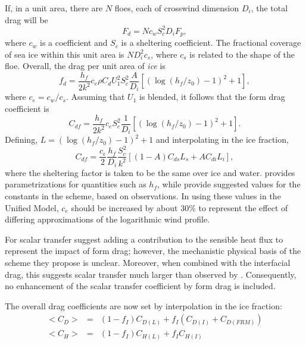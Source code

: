\documentclass{UMDP_article}
\begin{document}
\begin{enumerate}
If, in a unit area, there are $N$ floes, each of crosswind dimension $D_i$,
the total drag will be
\begin{equation}
F_d = N c_w S_c^2 D_i F_p,
\label{eq:fd_fp}
\end{equation}
where $c_w$ is a coefficient and $S_c$ is a sheltering coefficient. The
fractional coverage of sea ice within this unit area is $ND_i^2 c_s$, 
where $c_s$ is related to the shape of the floe. Overall, the drag per 
unit area of {\em ice} is
\begin{equation}
f_d = \frac{h_f}{2k^2} c_e \rho C_d U_1^2 S_c^2 \frac{A}{D_i}
\left [(\log(h_f/z_0) -1)^2 +1 \right ],
\end{equation}
where $c_e=c_w/c_s$. Assuming that $U_1$ is blended, it follows that the
form drag coefficient is
\begin{equation}
C_{df} = \frac{h_f}{2k^2} c_e S_c^2 \frac{1}{D_i}
\left [(\log(h_f/z_0) -1)^2 +1 \right ].
\end{equation}
Defining, $L=(\log(h_f/z_0) -1)^2 +1$ and interpolating in the ice fraction,
\begin{equation}
C_{df} = \frac{c_e}{2}\frac{h_f}{D_i}\frac{S_c^2}{k^2} \left [
(1-A) C_{ds} L_s + A C_{di} L_i \right ],
\end{equation}
where the sheltering factor is taken to be the same over ice and water.
\cite{lupkes2012} provides parametrizations for quantities such as
$h_f$, while \cite{elvidge2016} provide suggested values for the
constants in the scheme, based on observations. In using these values 
in the Unified Model, $c_e$ should be increased by about 30\% to represent
the effect of differing approximations of the logarithmic wind profile.

For scalar transfer \cite{lupkes2015} suggest adding a contribution to 
the sensible heat flux to represent the impact of form drag; however, 
the mechanistic physical basis of the scheme they propose is unclear.
Moreover, when combined with the interfacial drag, this suggests scalar 
transfer much larger than observed by \cite{schroder2003}. Consequently,
no enhancement of the scalar transfer coefficient by form drag is
included.

The overall drag coefficients are now set by interpolation in the ice fraction:
\begin{eqnarray}
  < C_D >&=& (1 - f_I) C_{D(L)} + f_I (C_{D(I)} + C_{D(FRM)})
  \label{eq:cdice_int} \\
  < C_H >&=& (1 - f_I) C_{H(L)} + f_I C_{H(I)} 
  \label{eq:chice_int} 
\end{eqnarray}

\end{enumerate}
\end{document}
